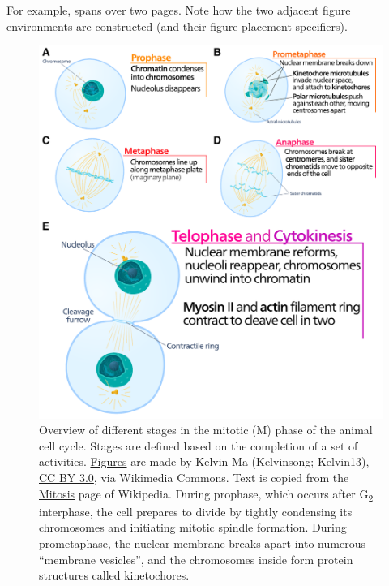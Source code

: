 For example,  spans over two pages. Note how the two adjacent figure environments are constructed (and their figure placement specifiers).

\begin{figure}[p]
    \centering
    \includegraphics[width=\linewidth]{figures/cell-cycle-mitosis.pdf}
    \caption[Stages of mitotic phase of the cell cycle]{%
        Overview of different stages in the mitotic (M) phase of the animal cell cycle.
        Stages are defined based on the completion of a set of activities.
        \href{https://commons.wikimedia.org/wiki/File:Animal_cell_cycle-en.svg}{Figures} are made by Kelvin Ma (Kelvinsong; Kelvin13), \href{https://creativecommons.org/licenses/by/3.0}{CC BY 3.0}, via Wikimedia Commons.
        Text is copied from the \href{https://en.wikipedia.org/wiki/Mitosis}{Mitosis} page of Wikipedia.
        During prophase, which occurs after G\textsubscript{2} interphase,
        the cell prepares to divide by tightly condensing its chromosomes and initiating mitotic spindle formation.
        During prometaphase, the nuclear membrane breaks apart into numerous ``membrane vesicles'', and the chromosomes inside form protein structures called kinetochores.
        \legendcontdnote
    }
    \label{fig:cell-cycle-mitosis}
\end{figure}
